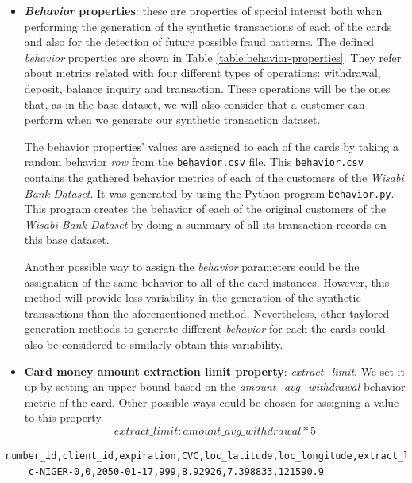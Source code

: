 \begin{itemize}
\item \textbf{\emph{Behavior} properties}: these are properties of special interest both when performing the 
generation of the synthetic transactions of each of the cards and also for the detection of future possible fraud patterns. The defined \emph{behavior} properties are shown in Table \ref{table:behavior-properties}. They refer about metrics related with four different types of operations: withdrawal, deposit, balance inquiry and transaction. These operations will be the ones that, as in the base dataset, we will also consider that a customer can perform when we generate our synthetic transaction dataset.



The behavior properties' values are assigned to each of the cards by taking a random behavior \emph{row} from the \texttt{behavior.csv} file. This \texttt{behavior.csv} contains the gathered behavior metrics of each of the customers of the \emph{Wisabi Bank Dataset}. It was generated by using the Python program \texttt{behavior.py}. This program creates the behavior of each of the original customers of the \emph{Wisabi Bank Dataset} by doing a summary of all its transaction records on this base dataset.

Another possible way to assign the \emph{behavior} parameters could be the assignation
of the same behavior to all of the card instances. However, this method will provide less variability in
the generation of the synthetic transactions than the aforementioned method. 
Nevertheless, other taylored generation methods to generate different \emph{behavior} for 
each the cards could also be considered to similarly obtain this
variability.

\item \textbf{Card money amount extraction limit property}: \emph{extract\_limit}. We set it up by setting an upper bound based on the \emph{amount\_avg\_withdrawal} behavior metric of the card. Other possible ways could be chosen for assigning a value to this property.
    $$extract\_limit: amount\_avg\_withdrawal * 5$$
\end{itemize}

\begin{center}
\lstset{style=csvStyle}
\begin{lstlisting}[caption={Example of card.csv (Part 1)}, label={csv:card}]
    number_id,client_id,expiration,CVC,loc_latitude,loc_longitude,extract_limit
    c-NIGER-0,0,2050-01-17,999,8.92926,7.398833,121590.9
\end{lstlisting}
\end{center}

